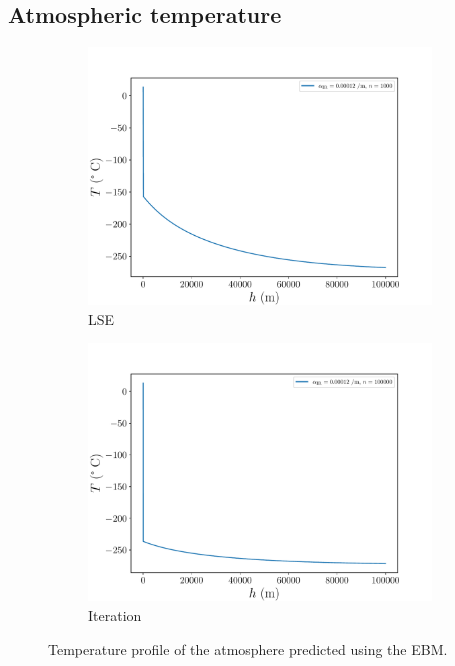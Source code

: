 \documentclass[a4paper,DIV=12,english]{scrartcl}
\begin{document}
\subsection{Atmospheric temperature}
\begin{figure}[h]
    \centering
    \begin{subfigure}{0.49\textwidth}
        \centering
        \includegraphics[width=\textwidth]{../plots/T_height/T_height_mat.pdf}
        \caption{LSE}
        \label{subfig:height_mat}
    \end{subfigure}
    \begin{subfigure}{0.49\textwidth}
        \centering
        \includegraphics[width=\textwidth]{../plots/T_height/T_height_it.pdf}
        \caption{Iteration}
        \label{subfig:height_it}
    \end{subfigure}
    \caption{Temperature profile of the atmosphere predicted using the EBM.}
    \label{fig:height}
\end{figure}
\end{document}

